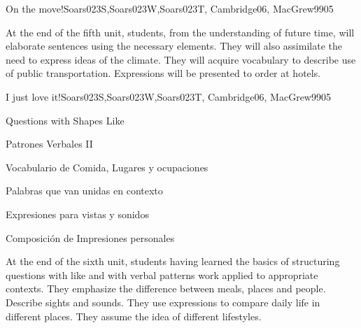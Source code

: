 \begin{syllabus}
\begin{unit}{On the move!}{}{Soars023S,Soars023W,Soars023T, Cambridge06, MacGrew99}{0}{5}
   \begin{learningoutcomes}
      \item At the end of the fifth unit, students, from the understanding of future time, will elaborate sentences using the necessary elements. They will also assimilate the need to express ideas of the climate. They will acquire vocabulary to describe use of public transportation. Expressions will be presented to order at hotels.
   \end{learningoutcomes}

\end{unit}

\begin{unit}{I just love it!}{}{Soars023S,Soars023W,Soars023T, Cambridge06, MacGrew99}{0}{5}
   \begin{topics}
      \item Questions with Shapes Like
      \item Patrones Verbales II
      \item Vocabulario de Comida, Lugares y ocupaciones
      \item Palabras que van unidas en contexto
      \item Expresiones para vistas y sonidos
      \item Composición de Impresiones personales
   \end{topics}

   \begin{learningoutcomes}
      \item At the end of the sixth unit, students having learned the basics of structuring questions with like and with verbal patterns work applied to appropriate contexts. They emphasize the difference between meals, places and people. Describe sights and sounds. They use expressions to compare daily life in different places. They assume the idea of different lifestyles.
   \end{learningoutcomes}
\end{unit}

\begin{coursebibliography}
\end{coursebibliography}

\end{syllabus}
